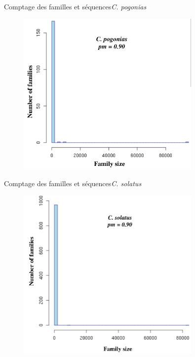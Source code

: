 \documentclass[11pt]{beamer}
\begin{document}
\begin{frame}{Comptage des familles et séquences}{\textit{C. pogonias}}
\begin{figure}
	\includegraphics[width=0.8\textwidth]
		{img/Cp_hist_family_distribution_pm090.png}
	\end{figure}	  
\end{frame}
\begin{frame}{Comptage des familles et séquences}{\textit{C. solatus}}
\begin{figure}
	\includegraphics[width=0.8\textwidth]
		{img/Cso_hist_family_distribution_pm090.png}
	\end{figure}	  
\end{frame}
\end{document}
